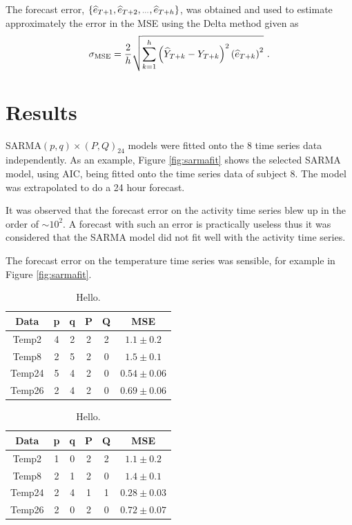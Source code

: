 \documentclass[a4paper]{proc}
\newcommand{\dotdotdot}{\vphantom{.}_{\cdots}}
\begin{document}
The forecast error, $\{\widehat{e}_{T+1},\widehat{e}_{T+2},\dotdotdot,\widehat{e}_{T+h}\}$, was obtained and used to estimate approximately the error in the MSE using the Delta method given as
\begin{equation}
\sigma_{\textup{MSE}} = \frac{2}{h}\sqrt{\sum_{k=1}^{h}\left(\widehat{Y}_{T+k}-Y_{T+k}\right)^2\left(\widehat{e}_{T+k}\right)^2} \ .
\end{equation}

\section{Results}
SARMA$(p,q)\times(P,Q)_{24}$ models were fitted onto the 8 time series data independently. As an example, Figure \ref{fig:sarmafit} shows the selected SARMA model, using AIC, being fitted onto the time series data of subject 8. The model was extrapolated to do a 24 hour forecast.

It was observed that the forecast error on the activity time series blew up in the order of $\sim 10^2$. A forecast with such an error is practically useless thus it was considered that the SARMA model did not fit well with the activity time series.

The forecast error on the temperature time series was sensible, for example in Figure \ref{fig:sarmafit}.

\begin{table}
\begin{center}
\begin{tabular}{ cccccc } 
 Data & p & q & P & Q & MSE\\
  \hline
 Temp2 & 4 & 2 & 2 & 2 & $1.1\pm0.2$\\
 Temp8 & 2 & 5 & 2 & 0 & $1.5\pm0.1$\\
 Temp24& 5 & 4 & 2 & 0 & $0.54\pm0.06$\\
 Temp26& 2 & 4 & 2 & 0 & $0.69\pm0.06$\\
\end{tabular}
\end{center}
\caption{Hello.}
\label{table:AIC}
\end{table}

\begin{table}
\begin{center}
\begin{tabular}{ cccccc } 
 Data & p & q & P & Q & MSE\\
  \hline
 Temp2 & 1 & 0 & 2 & 2 & $1.1\pm0.2$\\
 Temp8 & 2 & 1 & 2 & 0 & $1.4\pm0.1$\\
 Temp24& 2 & 4 & 1 & 1 & $0.28\pm0.03$\\
 Temp26& 2 & 0 & 2 & 0 & $0.72\pm0.07$\\
\end{tabular}
\end{center}
\caption{Hello.}
\label{table:BIC}
\end{table}
\end{document}
